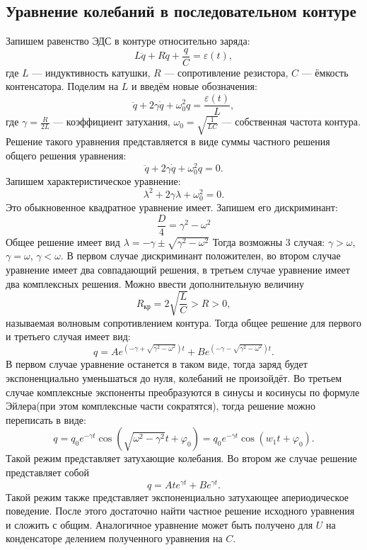 \documentclass[12pt]{article}
\begin{document}
\subsection*{Уравнение колебаний в последовательном контуре}
Запишем равенство ЭДС в контуре относительно заряда:
\begin{equation}
	L\ddot{q} + R \dot{q} + \frac{q}{C} = \varepsilon(t),
\end{equation}
где $L$ --- индуктивность катушки, $R$ --- сопротивление резистора, $C$ --- ёмкость контенсатора.
Поделим на $L$ и введём новые обозначения:
\[
	\ddot{q} + 2\gamma \dot{q} + \omega_0^2 q = \frac{\varepsilon(t)}{L},
\]
где $\gamma = \frac{R}{2L}$ --- коэффициент затухания, $\omega_0 = \sqrt{\frac{1}{LC}}$ --- собственная частота контура.
Решение такого уравнения представляется в виде суммы частного решения общего решения уравнения:
\[
	\ddot{q} + 2\gamma \dot{q} + \omega_0^2 q = 0.
\]
Запишем характеристическое уравнение:
\[
	\lambda^2 + 2\gamma \lambda + \omega_0^2 = 0.
\]
Это обыкновенное квадратное уравнение имеет. Запишем его дискриминант:
\[
	\frac{D}{4} = \gamma^2 - \omega^2
\]
Общее решение имеет вид $\lambda = -\gamma \pm \sqrt{\gamma^2 - \omega^2}$
Тогда возможны 3 случая: $\gamma > \omega$, $\gamma = \omega$, $\gamma < \omega$.
В первом случае дискриминант положителен, во втором случае уравнение имеет два совпадающий решения,
в третьем случае уравнение имеет два комплексных решения. Можно ввести дополнительную величину
\begin{equation}
	R_{\text{кр}} = 2\sqrt{\frac{L}{C}} > R > 0,
\end{equation}
называемая волновым сопротивлением контура.
Тогда общее решение для первого и третьего случая имеет вид:
\begin{equation}
	q = Ae^{\left( -\gamma + \sqrt{\gamma^2 - \omega^2} \right) t } + Be^{\left( -\gamma - \sqrt{\gamma^2 - \omega^2} \right) t }.
\end{equation}
В первом случае уравнение останется в таком виде, тогда заряд будет экспоненциально уменьшаться до нуля,
колебаний не произойдёт.
Во третьем случае комплексные экспоненты преобразуются в синусы и косинусы по формуле Эйлера(при этом
комплексные части сократятся), тогда
решение можно переписать в виде:
\begin{equation}
	q = q_0 e^{-\gamma t} \cos(\sqrt{\omega^2 - \gamma^2}t + \varphi_0) = q_0 e^{-\gamma t} \cos(w_1 t + \varphi_0).
\end{equation}
Такой режим представляет затухающие колебания.
Во втором же случае решение представляет собой
\begin{equation}
	q = A t e^{\gamma t} + B e^{\gamma t}.
\end{equation}
Такой режим также представляет экспоненциально затухающее апериодическое поведение.
После этого достаточно найти частное решение исходного уравнения и сложить с общим. Аналогичное уравнение может
быть получено для $U$ на конденсаторе делением полученного уравнения на $C$.
\end{document}
